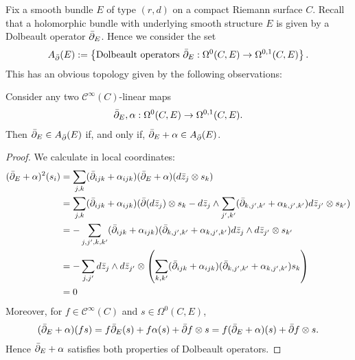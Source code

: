 \documentclass[12pt]{ociamthesis}  %
\begin{document}
Fix a smooth bundle $E$ of type $(r,d)$ on a compact Riemann surface $C$.
Recall that a holomorphic bundle with underlying smooth structure $E$
is given by a Dolbeault operator ${\bar{\partial}}_E$. Hence we consider the set
\begin{align*}
  A_{\bar{\partial}} (E) := \left\lbrace{
    \text{Dolbeault operators ${\bar{\partial}}_E : \Omega^0(C,E) \to \Omega^{0,1}(C,E)$}
  }\right\rbrace.
\end{align*}
This has an obvious topology given by the following observations:
\begin{lemma}\label{lem:affine_space_of_dolbeault_operators}
  Consider any two $\mathscr C^\infty(C)$-linear maps
  \begin{align*}
    {\bar{\partial}}_E,\alpha : \Omega^0(C,E) \to \Omega^{0,1}(C,E).
  \end{align*}
  Then ${\bar{\partial}}_E\in A_{\bar{\partial}} (E)$ if, and only if, ${\bar{\partial}}_E+\alpha\in A_{\bar{\partial}} (E)$.
  \begin{proof}
    We calculate in local coordinates:
    \begin{align*}
      ({\bar{\partial}}_E + \alpha)^2(s_i)
       & = \sum_{j,k} ({\bar{\partial}}_{ijk} + \alpha_{ijk})({\bar{\partial}}_E + \alpha)( d\bar z_j\otimes s_k)                                                                                     \\
       & = \sum_{j,k} ({\bar{\partial}}_{ijk} + \alpha_{ijk})({\bar{\partial}}(d\bar z_j) \otimes s_k -  d\bar z_j \wedge \sum_{j',k'}({\bar{\partial}}_{k,j',k'} + \alpha_{k,j',k'}) d\bar z_{j'}\otimes s_{k'}) \\
       & = - \sum_{j,j',k,k'} ({\bar{\partial}}_{ijk} + \alpha_{ijk})({\bar{\partial}}_{k,j',k'} + \alpha_{k,j',k'}) d\bar z_j \wedge d\bar z_{j'}\otimes s_{k'}                                      \\
       & = - \sum_{j,j'}
      d\bar z_j \wedge d\bar z_{j'}\otimes \left(
      \sum_{k,k'} ({\bar{\partial}}_{ijk} + \alpha_{ijk})({\bar{\partial}}_{k,j',k'} + \alpha_{k,j',k'}) s_{k}\right)                                                                                 \\
       & = 0
    \end{align*}
    Moreover, for $f\in \mathscr C^\infty(C)$ and $s\in\Omega^0(C,E)$,
    \begin{align*}
      ({\bar{\partial}}_E + \alpha)(fs) = f{\bar{\partial}}_E(s) + f\alpha(s) + {\bar{\partial}} f \otimes s
      = f({\bar{\partial}}_E+\alpha)(s) + {\bar{\partial}} f \otimes s.
    \end{align*}
    Hence ${\bar{\partial}}_E + \alpha$ satisfies both properties of Dolbeault
    operators.
  \end{proof}
\end{lemma}
\end{document}
